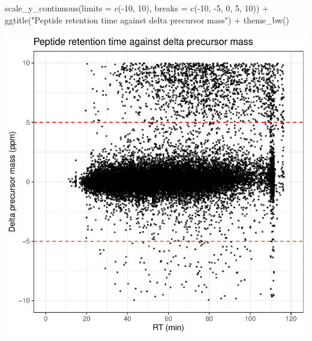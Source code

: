 \documentclass[9pt,a4paper,]{extarticle}
\newenvironment{Shaded}{\begin{snugshade}}{\end{snugshade}}
\newcommand{\AttributeTok}[1]{\textcolor[rgb]{0.77,0.63,0.00}{#1}}
\newcommand{\DecValTok}[1]{\textcolor[rgb]{0.00,0.00,0.81}{#1}}
\newcommand{\FunctionTok}[1]{\textcolor[rgb]{0.00,0.00,0.00}{#1}}
\newcommand{\NormalTok}[1]{#1}
\newcommand{\SpecialCharTok}[1]{\textcolor[rgb]{0.00,0.00,0.00}{#1}}
\newcommand{\StringTok}[1]{\textcolor[rgb]{0.31,0.60,0.02}{#1}}
\begin{document}
\begin{Shaded}
\begin{Highlighting}[]
  \FunctionTok{scale\_y\_continuous}\NormalTok{(}\AttributeTok{limits =} \FunctionTok{c}\NormalTok{(}\SpecialCharTok{{-}}\DecValTok{10}\NormalTok{, }\DecValTok{10}\NormalTok{), }\AttributeTok{breaks =} \FunctionTok{c}\NormalTok{(}\SpecialCharTok{{-}}\DecValTok{10}\NormalTok{, }\SpecialCharTok{{-}}\DecValTok{5}\NormalTok{, }\DecValTok{0}\NormalTok{, }\DecValTok{5}\NormalTok{, }\DecValTok{10}\NormalTok{)) }\SpecialCharTok{+}
  \FunctionTok{ggtitle}\NormalTok{(}\StringTok{"Peptide retention time against delta precursor mass"}\NormalTok{) }\SpecialCharTok{+}
  \FunctionTok{theme\_bw}\NormalTok{()}
\end{Highlighting}
\end{Shaded}

\begin{center}\includegraphics[height=0.3\textheight]{workflow_expressions_files/figure-latex/lfq_mass_accuracy-1} \end{center}
\end{document}
